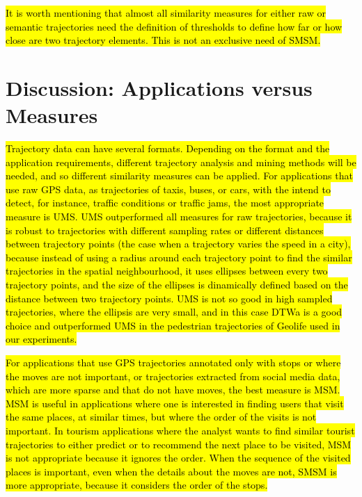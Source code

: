 \documentclass[12pt]{article}
\begin{document}
\hl{It is worth mentioning that almost all similarity measures for either raw or semantic trajectories need the definition of thresholds to define how far or how close are two trajectory elements. This is not an exclusive need of SMSM. }

\section{Discussion: Applications versus Measures}\label{sec:discussion}


\hl{Trajectory data can have several formats. Depending on the format and the application requirements, different trajectory analysis and mining methods will be needed, and so different similarity measures can be applied. For applications that use raw GPS data, as trajectories of taxis, buses, or cars, with the intend to detect, for instance, traffic conditions or traffic jams, the most appropriate measure is UMS. UMS outperformed all measures for raw trajectories, because it is robust to trajectories with different sampling rates or different distances between trajectory points (the case when a trajectory varies the speed in a city), because instead of using a radius around each trajectory point to find the similar trajectories in the spatial neighbourhood, it uses ellipses between every two trajectory points, and the size of the ellipses is dinamically defined based on the distance between two trajectory points. UMS is not so good in high sampled trajectories, where the ellipsis are very small, and in this case DTWa is  a good choice and outperformed UMS in the pedestrian trajectories of Geolife used in our experiments.}

\hl{For applications that use GPS trajectories annotated only with stops or where the moves are not important, or trajectories extracted from social media data, which are more sparse and that do not have moves, the best measure is MSM. MSM is useful in applications where one is interested in finding users that visit the same places, at similar times, but where the order of the visits is not important. In tourism applications where the analyst wants to find similar tourist trajectories to either predict or to recommend the next place to be visited, MSM is not appropriate because it ignores the order. When the sequence of the visited places is important, even when the details about the moves are not, SMSM is more appropriate, because it considers the order of the stops.}
\end{document}
